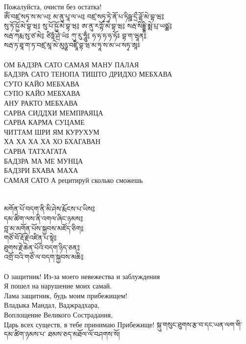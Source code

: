 Пожалуйста, очисти без остатка!\\
\ru
\newpage
\ti
ཨོཾ་བཛྲ་སཏྭ་ས་མ་ཡ༔ མ་ནུ་པཱ་ལ་ཡ༔ བཛྲ་སཏྭ་ཏྭེ་ནོ་པ་ཏིཥྛ་དྲྀ་ཌྷོ་མེ་བྷ་ཝ༔ \\
སུ་ཏོ་ཥྱོ་མེ་བྷ་ཝ༔ སུ་པོ་ཥྱོ་མེ་བྷ་ཝ༔ ཨ་ནུ་རཀྟོ་མེ་བྷ་ཝ༔ སརྦ་སིདྡྷི་མྨེ་པྲ་ཡཙྪ༔ \\
སརྦ་ཀརྨ་སུ་ཙ་མེ༔ ཙིཏྟཾ་ཤྲེ་ཡཾཿ ཀུ་རུ་ཧཱུྂ༔ ཧ་ཧ་ཧ་ཧ་ཧོཿ བྷ་ག་ཝཱན༔ \\
སརྦ་ཏ་ཐཱ་ག་ཏ་བཛྲ་མཱ་མེ་མུཉྩ་བཛྲཱི་བྷ་ཝ་མ་ཧཱ་ས་མ་ཡ་སཏྭ་ཨཱཿ\\
\\
\ru
ОМ БАДЗРА САТО САМАЯ МАНУ ПАЛАЯ\\
БАДЗРА САТО ТЕНОПА ТИШТО ДРИДХО МЕБХАВА\\
СУТО КАЙО МЕБХАВА\\
СУПО КАЙО МЕБХАВА\\
АНУ РАКТО МЕБХАВА\\
САРВА СИДДХИ МЕМПРАЯЦА\\
САРВА КАРМА СУЦАМЕ\\
ЧИТТАМ ШРИ ЯМ КУРУХУМ\\
ХА ХА ХА ХА ХО БХАГАВАН\\
САРВА ТАТХАГАТА\\
БАДЗРА МА МЕ МУНЦА\\
БАДЗРИ БХАВА МАХА\\
САМАЯ САТО А \hspace{2cm} рецитируй сколько сможешь\\
\\
\\
\ti
མགོན་པོ་བདག་ནི་མི་ཤེས་རྨོངས་པ་ཡིས༔\\
དམ་ཚིག་ལས་ནི་འགལ་ཞིང་ཉམས༔ \\
བླ་མ་མགོན་པོས་སྐྱབས་མཛོད་ཅིག༔ \\
གཙོ་བོ་རྡོ་རྗེ་འཛིན་པ་སྟེ༔ \\
ཐུགས་རྗེ་ཆེན་པོའི་བདག་ཉིད་ཅན༔ \\
འགྲོ་བའི་གཙོ་ལ་བདག་སྐྱབས་མཆི༔\\
\\
\ru
О защитник! Из-за моего невежества и заблуждения\\
Я пошел на нарушение моих самай.\\
Лама защитник, будь моим прибежищем!\\
Владыка Мандал, Ваджрадхара,\\
Воплощение Великого Сострадания,\\
Царь всех существ, в тебе принимаю Прибежище!
\newpage
\ti
སྐུ་གསུང་ཐུགས་རྩ་བ་དང་ཡན་ལག་གི་དམ་ཚིག་ཉམས་པ་ ཐམས་ཅད་མཐོལ་ལོ་བཤགས་སོ། \\
